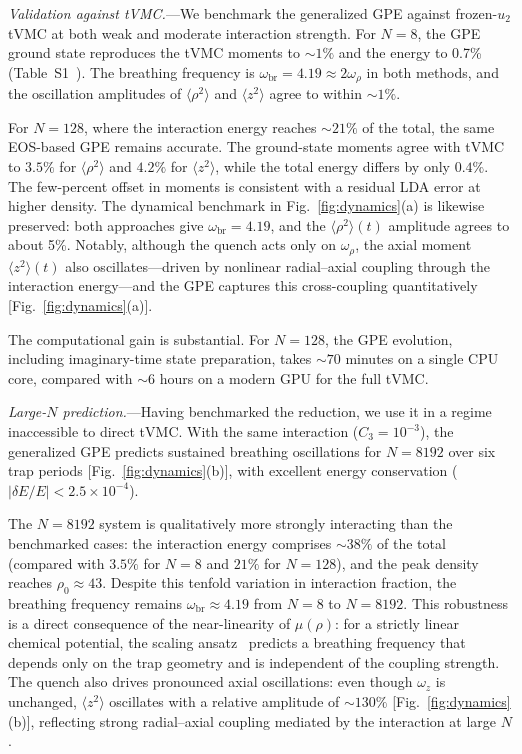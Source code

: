\documentclass[aps,prl,twocolumn,superscriptaddress,longbibliography]{revtex4-2}
\newcommand{\avg}[1]{\langle #1 \rangle}
\begin{document}
\emph{Validation against tVMC.}---We benchmark the generalized GPE
against frozen-$u_2$ tVMC at both weak and moderate interaction
strength.  For $N=8$, the GPE ground state reproduces the tVMC moments
to $\sim\!1\%$ and the energy to 0.7\% (Table~S1~\cite{SM_note}).  The
breathing frequency is $\omega_{\mathrm{br}} = 4.19 \approx 2\omega_\rho$
in both methods, and the oscillation amplitudes of $\avg{\rho^2}$ and
$\avg{z^2}$ agree to within $\sim\!1\%$.

For $N=128$, where the interaction energy reaches $\sim 21\%$ of the
total, the same EOS-based GPE remains accurate.  The ground-state
moments agree with tVMC to $3.5\%$ for $\avg{\rho^2}$ and $4.2\%$ for
$\avg{z^2}$, while the total energy differs by only $0.4\%$.
The few-percent offset in moments is consistent with a residual LDA
error at higher density.  The dynamical benchmark in
Fig.~\ref{fig:dynamics}(a) is likewise preserved: both approaches give
$\omega_{\mathrm{br}} = 4.19$, and the $\avg{\rho^2}(t)$ amplitude agrees
to about 5\%.  Notably, although the quench acts only on $\omega_\rho$,
the axial moment $\avg{z^2}(t)$ also oscillates---driven by nonlinear
radial--axial coupling through the interaction energy---and the GPE
captures this cross-coupling quantitatively
[Fig.~\ref{fig:dynamics}(a)].

The computational gain is substantial.  For $N=128$, the GPE evolution,
including imaginary-time state preparation, takes $\sim 70$ minutes on
a single CPU core, compared with $\sim 6$ hours on a modern GPU for the
full tVMC.

\emph{Large-$N$ prediction.}---Having benchmarked the reduction, we use
it in a regime inaccessible to direct tVMC.  With the same interaction
($C_3 = 10^{-3}$), the generalized GPE predicts sustained breathing
oscillations for $N=8192$ over six trap periods
[Fig.~\ref{fig:dynamics}(b)], with excellent energy conservation
($|\delta E/E| < 2.5\times 10^{-4}$).

The $N=8192$ system is qualitatively more strongly interacting than the
benchmarked cases: the interaction energy comprises $\sim 38\%$ of the
total (compared with $3.5\%$ for $N=8$ and $21\%$ for $N=128$), and
the peak density reaches $\rho_0 \approx 43$.  Despite this tenfold
variation in interaction fraction, the breathing frequency remains
$\omega_{\mathrm{br}} \approx 4.19$ from $N=8$ to $N=8192$.  This
robustness is a direct consequence of the near-linearity of
$\mu(\rho)$: for a strictly linear chemical potential, the scaling
ansatz~\cite{CastinDum1996,Stringari1996} predicts a breathing
frequency that depends only on the trap geometry and is independent of
the coupling strength.  The quench also drives pronounced axial
oscillations: even though $\omega_z$ is unchanged, $\avg{z^2}$
oscillates with a relative amplitude of $\sim 130\%$
[Fig.~\ref{fig:dynamics}(b)], reflecting strong radial--axial coupling
mediated by the interaction at large $N$.
\end{document}
